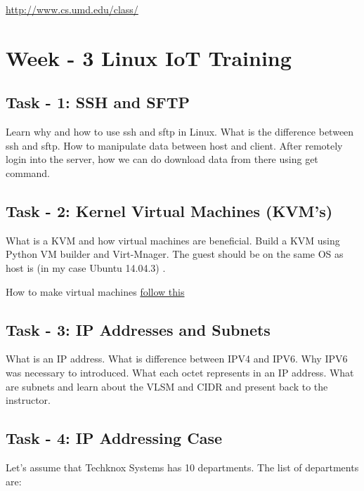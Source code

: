 \documentclass[letterpaper,10pt,english]{sphinxmanual}
\begin{document}
\href{http://www.cs.umd.edu/class/}{http://www.cs.umd.edu/class/}


\chapter{Week - 3 Linux IoT Training}
\label{week-03:week-3-linux-iot-training}\label{week-03::doc}\label{week-03:week-03}

\section{Task - 1: SSH and SFTP}
\label{week-03:task-1-ssh-and-sftp}
Learn why and how to use ssh and sftp in Linux. What is the difference between ssh and sftp. How to manipulate data between host and client. After remotely login into the server, how we can do download data from there using get command.


\section{Task - 2: Kernel Virtual Machines (KVM's)}
\label{week-03:task-2-kernel-virtual-machines-kvm-s}
What is a KVM and how virtual machines are beneficial. Build a KVM using Python VM builder and Virt-Mnager. The guest should be on the same OS as host is (in my case Ubuntu 14.04.3) .

How to make virtual machines \href{https://www.howtoforge.com/creating-virtual-machines-for-xen-kvm-vmware-workstation-6-vmware-server-with-vmbuilder-on-ubuntu-8.10-p2}{follow this}


\section{Task - 3: IP Addresses and Subnets}
\label{week-03:task-3-ip-addresses-and-subnets}
What is an IP address. What is difference between IPV4 and IPV6. Why IPV6 was necessary to introduced. What each octet represents in an IP address. What are subnets and learn about the VLSM and CIDR and present back to the instructor.


\section{Task - 4: IP Addressing Case}
\label{week-03:task-4-ip-addressing-case}
Let's assume that Techknox Systems has 10 departments. The list of departments are:
\end{document}
